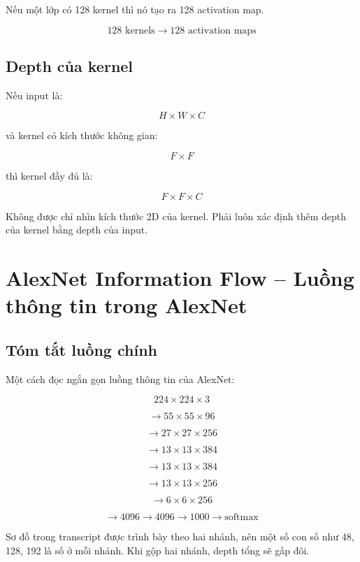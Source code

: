 Nếu một lớp có 128 kernel thì nó tạo ra 128 activation map.

\[
    128 \text{ kernels}
    \rightarrow
    128 \text{ activation maps}
\]

\subsection{Depth của kernel}

Nếu input là:

\[
    H\times W\times C
\]

và kernel có kích thước không gian:

\[
    F\times F
\]

thì kernel đầy đủ là:

\[
    F\times F\times C
\]

\begin{canhbao}
Không được chỉ nhìn kích thước 2D của kernel. Phải luôn xác định thêm depth của kernel bằng depth của input.
\end{canhbao}

\section{AlexNet Information Flow -- Luồng thông tin trong AlexNet}

\subsection{Tóm tắt luồng chính}

Một cách đọc ngắn gọn luồng thông tin của AlexNet:

\[
    224\times224\times3
\]

\[
    \rightarrow
    55\times55\times96
\]

\[
    \rightarrow
    27\times27\times256
\]

\[
    \rightarrow
    13\times13\times384
\]

\[
    \rightarrow
    13\times13\times384
\]

\[
    \rightarrow
    13\times13\times256
\]

\[
    \rightarrow
    6\times6\times256
\]

\[
    \rightarrow
    4096
    \rightarrow
    4096
    \rightarrow
    1000
    \rightarrow
    \text{softmax}
\]

\begin{luuy}
Sơ đồ trong transcript được trình bày theo hai nhánh, nên một số con số như 48, 128, 192 là số ở mỗi nhánh. Khi gộp hai nhánh, depth tổng sẽ gấp đôi.
\end{luuy}

